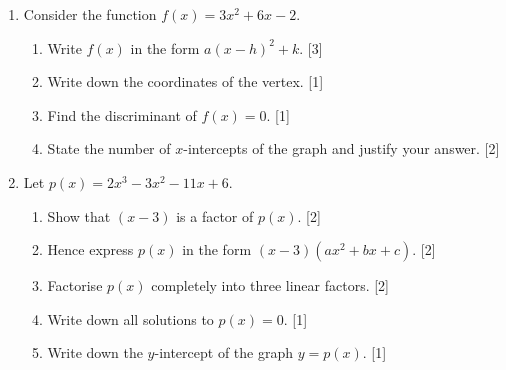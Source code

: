\documentclass[12pt, twoside]{article}
\begin{document}
\begin{enumerate}[itemsep=0.15cm]

\newpage

\item[3.] [Maximum mark: 7]

Consider the function $f(x) = 3x^2 + 6x - 2$.

\begin{enumerate}[itemsep=0.15cm]
  \item Write $f(x)$ in the form $a(x - h)^2 + k$. \hfill [3]
  \item Write down the coordinates of the vertex. \hfill [1]
  \item Find the discriminant of $f(x) = 0$. \hfill [1]
  \item State the number of $x$-intercepts of the graph
  and justify your answer. \hfill [2]
\end{enumerate}


\newpage

\item[4.] [Maximum mark: 8]

Let $p(x) = 2x^3 - 3x^2 - 11x + 6$.

\begin{enumerate}[itemsep=0.15cm]
  \item Show that $(x - 3)$ is a factor of $p(x)$. \hfill [2]
  \item Hence express $p(x)$ in the form
  $(x - 3)(ax^2 + bx + c)$. \hfill [2]
  \item Factorise $p(x)$ completely into three
  linear factors. \hfill [2]
  \item Write down all solutions to $p(x) = 0$. \hfill [1]
  \item Write down the $y$-intercept of the graph
  $y = p(x)$. \hfill [1]
\end{enumerate}


\end{enumerate}
\end{document}

